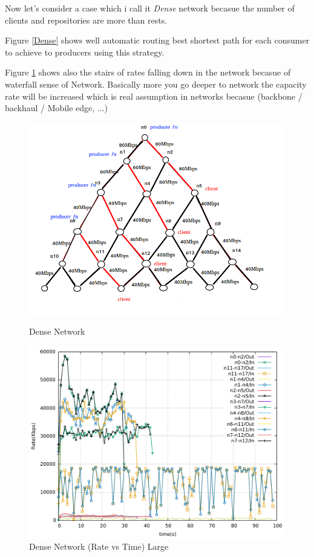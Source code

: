 Now let's consider a case which i call it \textit{Dense} network becasue the number of clients and repositories are more than rests.

Figure \ref{Dense} shows well automatic routing best shortest path for each consumer to achieve to producers using this strategy.

Figure \ref{dense} shows also the stairs of rates falling down in the network becasue of waterfall sense of Network. Basically more you go deeper to network the capacity rate will be increased which is real assumption in networks becasue (backbone / backhaul / Mobile edge, ...)
\begin{figure}[H]

\begin{center}


\includegraphics[scale = 0.4]{Figures/dense.png}

\caption{Dense Network} \label{Dense} 

\includegraphics[scale = 0.4]{Figures/dense.pdf}

\caption{Dense Network (Rate vs Time) Large} \label{dense} 


\end{center}

\end{figure}
